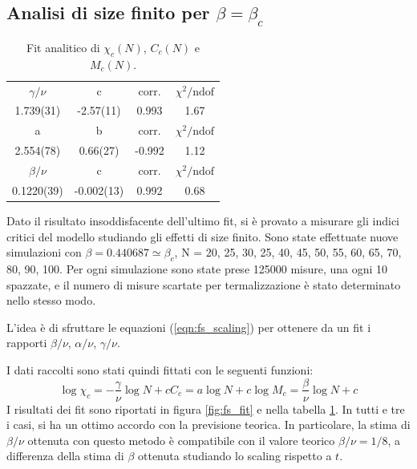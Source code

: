 \documentclass[a4paper,11pt]{article}
\newcommand{\chindof}{\chi^2 / \text{ndof}}
\begin{document}
	\subsection{Analisi di size finito per $\beta = \beta_c$}
	\begin{table}
       \centering
        \begin{tabular}{c c c c } \hline 
                $\gamma/\nu$  & c    & corr. & $\chindof$ \\ 
                1.739(31) & -2.57(11)   & 0.993   & 1.67 \\ \hline
                a  & b    & corr. & $\chindof$ \\ 
                2.554(78) & 0.66(27)   & -0.992   & 1.12 \\ \hline
                $\beta/\nu$  & c    & corr. & $\chindof$ \\ 
                0.1220(39) & -0.002(13)   & 0.992   & 0.68 \\ \hline
        \end{tabular}
        \caption{Fit analitico di $\chi_c(N)$, $C_c(N)$ e $M_c(N)$.}
        \label{tab:fs_fit}
	\end{table}
	Dato il risultato insoddisfacente dell'ultimo fit, si è provato a misurare gli indici critici del modello studiando gli effetti di size finito. Sono state effettuate nuove simulazioni con $\beta = 0.440687 \simeq \beta_c$, N = 20, 25, 30, 25, 40, 45, 50, 55, 60, 65, 70, 80, 90, 100. Per ogni simulazione sono state prese 125000 misure, una ogni 10 spazzate, e il numero di misure scartate per termalizzazione è stato determinato nello stesso modo.
	
	L'idea è di sfruttare le equazioni (\ref{eqn:fs_scaling}) per ottenere da un fit i rapporti $\beta / \nu$, $\alpha / \nu$, $\gamma / \nu$. 

	
	I dati raccolti sono stati quindi fittati con le seguenti funzioni:
	\begin{subequations}
        \begin{equation}
            \log \chi_c = - \frac{\gamma}{\nu} \log N + c
        \end{equation}
         \begin{equation}
            C_c = a \log N + c
        \end{equation}  
        \begin{equation}
            \log M_c = \frac{\beta}{\nu} \log N + c
        \end{equation}
	\end{subequations}
	I risultati dei fit sono riportati in figura \ref{fig:fs_fit} e nella tabella \ref{tab:fs_fit}. In tutti e tre i casi, si ha un ottimo accordo con la previsione teorica. In particolare, la stima di $\beta / \nu$ ottenuta con questo metodo è compatibile con il valore teorico $\beta / \nu = 1/8$, a differenza della stima di $\beta$ ottenuta studiando lo scaling rispetto a $t$.
	
\end{document}
